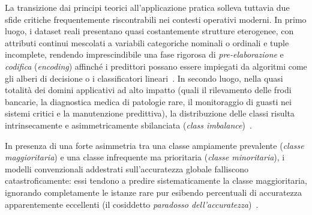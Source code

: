 La transizione dai principi teorici all'applicazione pratica solleva tuttavia due sfide critiche frequentemente riscontrabili nei contesti operativi moderni. In primo luogo, i dataset reali presentano quasi costantemente strutture eterogenee, con attributi continui mescolati a variabili categoriche nominali o ordinali e tuple incomplete, rendendo imprescindibile una fase rigorosa di \textit{pre-elaborazione} e \textit{codifica} (\textit{encoding}) affinché i predittori possano essere impiegati da algoritmi come gli alberi di decisione o i classificatori lineari~\cite{tan2018}. In secondo luogo, nella quasi totalità dei domini applicativi ad alto impatto (quali il rilevamento delle frodi bancarie, la diagnostica medica di patologie rare, il monitoraggio di guasti nei sistemi critici e la manutenzione predittiva), la distribuzione delle classi risulta intrinsecamente e asimmetricamente sbilanciata (\textit{class imbalance})~\cite{chawla2002, mannocci2026imbalanced}.

In presenza di una forte asimmetria tra una classe ampiamente prevalente (\textit{classe maggioritaria}) e una classe infrequente ma prioritaria (\textit{classe minoritaria}), i modelli convenzionali addestrati sull'accuratezza globale falliscono catastroficamente: essi tendono a predire sistematicamente la classe maggioritaria, ignorando completamente le istanze rare pur esibendo percentuali di accuratezza apparentemente eccellenti (il cosiddetto \textit{paradosso dell'accuratezza})~\cite{mannocci2026imbalanced}.

